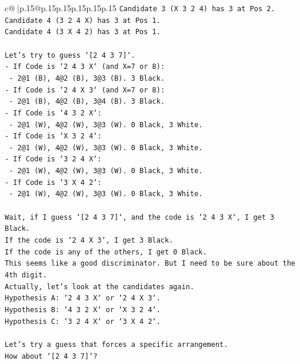 \documentclass{article}
\begin{document}
{\begin{supertabular}{c@{$\;$}|p{.15\linewidth}@{}p{.15\linewidth}p{.15\linewidth}p{.15\linewidth}p{.15\linewidth}p{.15\linewidth}}
{{{\texttt{Candidate 3 (X 3 2 4) has 3 at Pos 2.} \\
\texttt{Candidate 4 (3 2 4 X) has 3 at Pos 1.} \\
\texttt{Candidate 4 (3 X 4 2) has 3 at Pos 1.} \\
\\ 
\texttt{Let's try to guess `{[}2 4 3 7{]}`.} \\
\texttt{{-} If Code is `2 4 3 X` (and X=7 or 8):} \\
\texttt{    {-} 2@1 (B), 4@2 (B), 3@3 (B). 3 Black.} \\
\texttt{{-} If Code is `2 4 X 3` (and X=7 or 8):} \\
\texttt{    {-} 2@1 (B), 4@2 (B), 3@4 (B). 3 Black.} \\
\texttt{{-} If Code is `4 3 2 X`:} \\
\texttt{    {-} 2@1 (W), 4@2 (W), 3@3 (W). 0 Black, 3 White.} \\
\texttt{{-} If Code is `X 3 2 4`:} \\
\texttt{    {-} 2@1 (W), 4@2 (W), 3@3 (W). 0 Black, 3 White.} \\
\texttt{{-} If Code is `3 2 4 X`:} \\
\texttt{    {-} 2@1 (W), 4@2 (W), 3@3 (W). 0 Black, 3 White.} \\
\texttt{{-} If Code is `3 X 4 2`:} \\
\texttt{    {-} 2@1 (W), 4@2 (W), 3@3 (W). 0 Black, 3 White.} \\
\\ 
\texttt{Wait, if I guess `{[}2 4 3 7{]}`, and the code is `2 4 3 X`, I get 3 Black.} \\
\texttt{If the code is `2 4 X 3`, I get 3 Black.} \\
\texttt{If the code is any of the others, I get 0 Black.} \\
\texttt{This seems like a good discriminator. But I need to be sure about the 4th digit.} \\
\texttt{Actually, let's look at the candidates again.} \\
\texttt{Hypothesis A: `2 4 3 X` or `2 4 X 3`.} \\
\texttt{Hypothesis B: `4 3 2 X` or `X 3 2 4`.} \\
\texttt{Hypothesis C: `3 2 4 X` or `3 X 4 2`.} \\
\\ 
\texttt{Let's try a guess that forces a specific arrangement.} \\
\texttt{How about `{[}2 4 3 7{]}`?} \\
}}}
\end{supertabular}}
\end{document}
